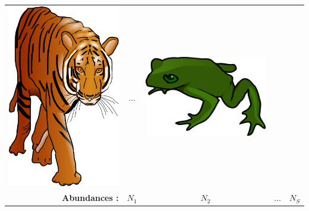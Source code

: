 \documentclass{beamer}
\begin{document}
\begin{frame}
{\begin{tabular}{rcccc}
\begin{minipage}{.3\textwidth}
      \includegraphics[width=.6\linewidth]{tiger.png}
    \end{minipage} &  $\dots$  & 
    \begin{minipage}{.3\textwidth}
      \includegraphics[width=.8\linewidth]{frog.png}
    \end{minipage}\\
  \textbf{Abundances :} & $N_1$ & $N_2$ & $\dots$ & $N_S$  
\end{tabular}
}

\end{frame}
\end{document}
